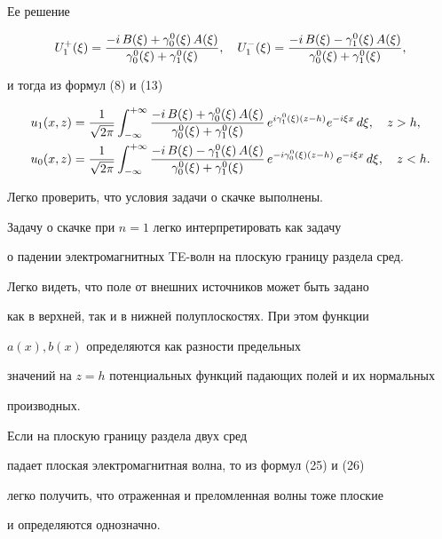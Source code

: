 Ее решение


$$


U_1^+(\xi)=\frac{-i\,B(\xi)+\gaoxi{0}\,A(\xi)}{\gaoxi{0}+\gaoxi{1}},\quad


U_1^-(\xi)=\frac{-i\,B(\xi)-\gaoxi{1}\,A(\xi)}{\gaoxi{0}+\gaoxi{1}} ,


$$


и тогда из формул (8) и (13)


\begin{align}


u_1(x,z) &= \frac{1}{\sqrt{2\pi}} \int_{-\infty}^{+\infty}


\frac{-i\,B(\xi)+\gaoxi{0}\,A(\xi)}{\gaoxi{0}+\gaoxi{1}}


\,e^{i\gaoxi{1}(z-h)}e^{-i\xi x}\,d\xi ,\quad z>h ,\\


%


u_0(x,z) &= \frac{1}{\sqrt{2\pi}} \int_{-\infty}^{+\infty}


\frac{-i\,B(\xi)-\gaoxi{1}\,A(\xi)}{\gaoxi{0}+\gaoxi{1}}


\,e^{-i\gaoxi{0}(z-h)}\,e^{-i\xi x}\,d\xi ,\quad z<h .


\end{align}


Легко проверить, что условия задачи о скачке выполнены.





Задачу о скачке при $n=1$ легко интерпретировать как задачу


о падении электромагнитных TE-волн на плоскую границу раздела сред.


Легко видеть, что поле от внешних источников может быть задано


как в верхней, так и в нижней полуплоскостях. При этом функции


$a(x), b(x)$ определяются как разности предельных


значений на $z=h$ потенциальных функций падающих полей и их нормальных


производных.





\begin{note}


Если на плоскую границу раздела двух сред


падает плоская электромагнитная волна, то из формул (25) и (26)


легко получить, что отраженная и преломленная волны тоже плоские


и определяются однозначно.


\end{note}





